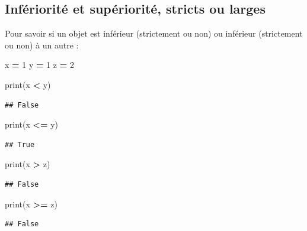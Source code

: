 \documentclass[12pt,]{book}
\newenvironment{Shaded}{\begin{snugshade}}{\end{snugshade}}
\newcommand{\DecValTok}[1]{\textcolor[rgb]{0.00,0.00,0.81}{#1}}
\newcommand{\OperatorTok}[1]{\textcolor[rgb]{0.81,0.36,0.00}{\textbf{#1}}}
\newcommand{\BuiltInTok}[1]{#1}
\newcommand{\NormalTok}[1]{#1}
\numberwithin{equation}{section}
\numberwithin{countremarque}{section}
\begin{document}
\subsection{Infériorité et supériorité, stricts ou
larges}\label{inferiorite-et-superiorite-stricts-ou-larges}

Pour savoir si un objet est inférieur (strictement ou non) ou inférieur
(strictement ou non) à un autre :

\begin{Shaded}
\begin{Highlighting}[]
\NormalTok{x }\OperatorTok{=} \DecValTok{1}
\NormalTok{y }\OperatorTok{=} \DecValTok{1}
\NormalTok{z }\OperatorTok{=} \DecValTok{2}

\BuiltInTok{print}\NormalTok{(x }\OperatorTok{<}\NormalTok{ y)}
\end{Highlighting}
\end{Shaded}

\begin{lstlisting}
## False
\end{lstlisting}

\begin{Shaded}
\begin{Highlighting}[]
\BuiltInTok{print}\NormalTok{(x }\OperatorTok{<=}\NormalTok{ y)}
\end{Highlighting}
\end{Shaded}

\begin{lstlisting}
## True
\end{lstlisting}

\begin{Shaded}
\begin{Highlighting}[]
\BuiltInTok{print}\NormalTok{(x }\OperatorTok{>}\NormalTok{ z)}
\end{Highlighting}
\end{Shaded}

\begin{lstlisting}
## False
\end{lstlisting}

\begin{Shaded}
\begin{Highlighting}[]
\BuiltInTok{print}\NormalTok{(x }\OperatorTok{>=}\NormalTok{ z)}
\end{Highlighting}
\end{Shaded}

\begin{lstlisting}
## False
\end{lstlisting}
\end{document}

